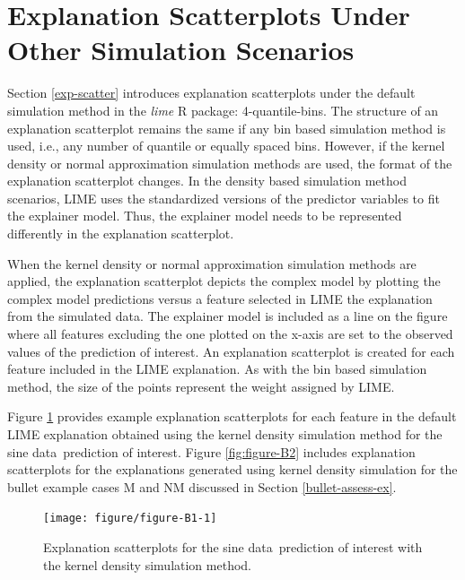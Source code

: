 \documentclass[AMS,STIX2COL]{WileyNJD-v2}\usepackage[]{graphicx}\usepackage[]{color}
\newenvironment{knitrout}{}{} %
\newcommand{\data}{sine data}
\begin{document}
\section{Explanation Scatterplots Under Other Simulation Scenarios} \label{exp-scatter_plus}

Section \ref{exp-scatter} introduces explanation scatterplots under the default simulation method in the \emph{lime} R package: 4-quantile-bins. The structure of an explanation scatterplot remains the same if any bin based simulation method is used, i.e., any number of quantile or equally spaced bins. However, if the kernel density or normal approximation simulation methods are used, the format of the explanation scatterplot changes. In the density based simulation method scenarios, LIME uses the standardized versions of the predictor variables to fit the explainer model. Thus, the explainer model needs to be represented differently in the explanation scatterplot.

When the kernel density or normal approximation simulation methods are applied, the explanation scatterplot depicts the complex model by plotting the complex model predictions versus a feature selected in LIME the explanation from the simulated data. The explainer model is included as a line on the figure where all features excluding the one plotted on the x-axis are set to the observed values of the prediction of interest. An explanation scatterplot is created for each feature included in the LIME explanation. As with the bin based simulation method, the size of the points represent the weight assigned by LIME.

Figure \ref{fig:figure-B1} provides example explanation scatterplots for each feature in the default LIME explanation obtained using the kernel density simulation method for the \data \ prediction of interest. Figure \ref{fig:figure-B2} includes explanation scatterplots for the explanations generated using kernel density simulation for the bullet example cases M and NM discussed in Section \ref{bullet-assess-ex}.

\begin{figure}[!thp]
\begin{knitrout}
\color{fgcolor}

{\centering \texttt{[image: figure/figure-B1-1]} 

}



\end{knitrout}
\caption{Explanation scatterplots for the \data \ prediction of interest with the kernel density simulation method.}
\label{fig:figure-B1}
\end{figure}
\end{document}
